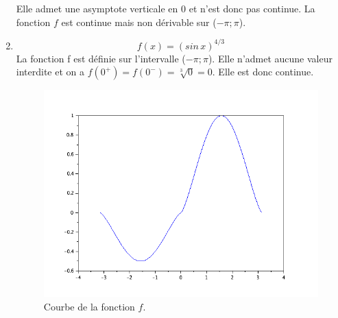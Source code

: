 \documentclass[a4paper,12pt]{report}
\begin{document}
\begin{enumerate}
	Elle admet une asymptote verticale en $0$ et n'est donc pas continue. 
	La fonction $f$ est continue mais non d\'erivable sur ($-\pi;\pi$).
	\newpage
	\item \[f(x)=(sin\,x)^{4/3}\]
	La fonction f est d\'efinie sur l'intervalle ($-\pi;\pi$). Elle n'admet aucune valeur interdite et on a $f(0^+)=f(0^-)=\sqrt[3]{0}=0$. Elle est donc continue.
	\begin{figure}[h!]
		\centering
		\includegraphics[scale=0.6]{ex2_fig2.png}
		\caption{\label{figure2}Courbe de la fonction $f$.}
		\end{figure}\\
		

\end{enumerate}
\end{document}
